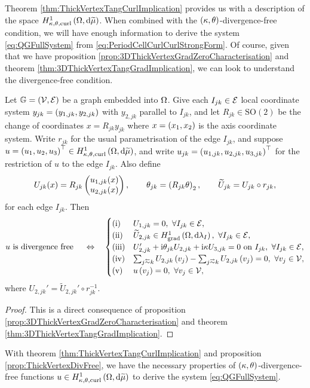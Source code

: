 Theorem \ref{thm:ThickVertexTangCurlImplication} provides us with a description of the space $H^1_{\kappa,\theta,\mathrm{curl}}\left( \Omega, \mathrm{d}\widetilde{\mu} \right)$.
When combined with the $\left( \kappa, \theta \right)$-divergence-free condition, we will have enough information to derive the system \eqref{eq:QGFullSystem} from \eqref{eq:PeriodCellCurlCurlStrongForm}.
Of course, given that we have proposition \ref{prop:3DThickVertexGradZeroCharacterisation} and theorem \ref{thm:3DThickVertexTangGradImplication}, we can look to understand the divergence-free condition.

\begin{prop} \label{prop:ThickVertexDivFree}
	Let $\mathbb{G}=\left( \mathcal{V}, \mathcal{E} \right)$ be a graph embedded into $\Omega$.
	Give each $I_{jk}\in\mathcal{E}$ local coordinate system $y_{jk}=\left( y_{1, jk},y_{2, jk} \right)$ with $y_{2,jk}$ parallel to $I_{jk}$, and let $R_{jk}\in\mathrm{SO}(2)$ be the change of coordinates $x=R_{jk}y_{jk}$ where $x=\left( x_1, x_2 \right)$ is the axis coordinate system.
	Write $r_{jk}$ for the usual parametrisation of the edge $I_{jk}$, and suppose $u=\left( u_1, u_2, u_3 \right)^\top\in H^1_{\kappa,\theta,\mathrm{curl}}\left( \Omega, \mathrm{d}\widetilde{\mu} \right)$, and write $u_{jk}=\left( u_{1,jk}, u_{2,jk}, u_{3,jk} \right)^\top$ for the restriction of $u$ to the edge $I_{jk}$.
	Also define
	\begin{align*}
		U_{jk}(x) = R_{jk}\begin{pmatrix} u_{1, jk}(x) \\ u_{2, jk}(x) \end{pmatrix},
		\qquad \theta_{jk} = \left(  R_{jk}\theta  \right)_2,
		\qquad \widetilde{U}_{jk} = U_{jk} \circ r_{jk},
	\end{align*}
	for each edge $I_{jk}$.
	Then
	\begin{align*}
		u \text{ is divergence free } \quad\Leftrightarrow\quad
		\begin{cases}
			\mathrm{(i)} & U_{1, jk} = 0, \ \forall I_{jk}\in\edgeSet, \\
			\mathrm{(ii)} & \widetilde{U}_{2,jk} \in\gradSob{\ddom}{\lambda_I}, \ \forall I_{jk}\in\edgeSet, \\
			\mathrm{(iii)} & U_{2,jk}' + \rmi\qm_{jk} U_{2,jk} + \rmi\wavenumber U_{3,jk} = 0 \text{ on } I_{jk}, \ \forall I_{jk}\in\edgeSet, \\
			\mathrm{(iv)} & \sum_{j\conRight k} U_{2,jk}\bracs{v_j} - \sum_{j\conLeft k} U_{2,jk}\bracs{v_j} = 0, \ \forall v_j\in\vertSet, \\
			\mathrm{(v)} & u\bracs{v_j}=0, \ \forall v_j\in\vertSet,
		\end{cases}
	\end{align*}
	where $U_{2,jk}' = \widetilde{U}_{2,jk}'\circ r_{jk}^{-1}$.
\end{prop}
\begin{proof}
	This is a direct consequence of proposition \ref{prop:3DThickVertexGradZeroCharacterisation} and theorem \ref{thm:3DThickVertexTangGradImplication}.
\end{proof}

With theorem \ref{thm:ThickVertexTangCurlImplication} and proposition \ref{prop:ThickVertexDivFree}, we have the necessary properties of $\left( \kappa, \theta \right)$-divergence-free functions $u\in H^1_{\kappa,\theta,\mathrm{curl}}\left( \Omega, \mathrm{d}\widetilde{\mu} \right)$ to derive the system \eqref{eq:QGFullSystem}.
